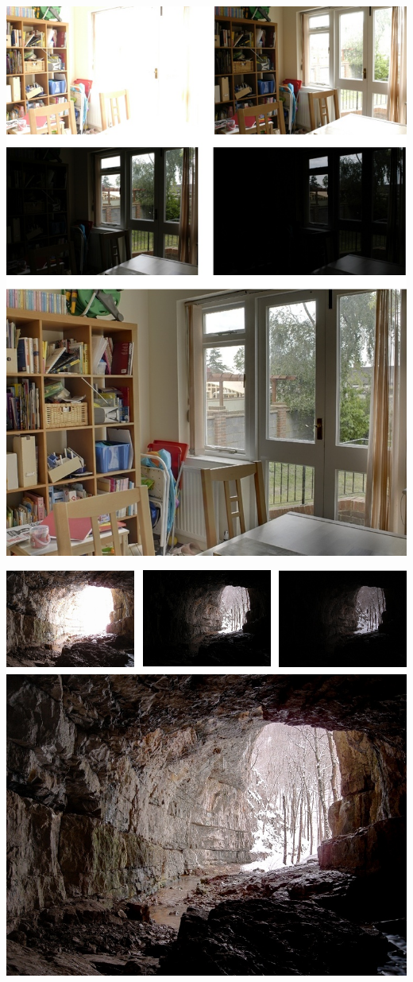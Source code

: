 \documentclass[a4paper,10pt]{article}
\begin{document}
        \includegraphics[width=\textwidth]{fused1.jpg}
        
        \includegraphics[width=\textwidth]{fused2.jpg}
        
\end{document}
